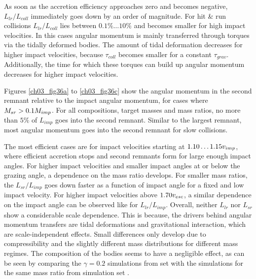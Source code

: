 As soon as the accretion efficiency approaches zero and becomes negative, $L_{lr} / L_{coll}$ immediately goes down by an order of magnitude. For hit \& run collisions $L_{lr} / L_{coll}$ lies between $0.1\% \dots 10\%$ and becomes smaller for high impact velocities. In this cases angular momentum is mainly transferred through torques via the tidally deformed bodies. The amount of tidal deformation decreases for higher impact velocities, because $\tau_{coll}$ becomes smaller for a constant $\tau_{grav}$. Additionally, the time for which these torques can build up angular momentum decreases for higher impact velocities.

Figures \ref{ch03_fig36a} to \ref{ch03_fig36c} show the angular momentum in the second remnant relative to the impact angular momentum, for cases where $M_{sr} > 0.1 M_{imp}$. For all compositions, target masses and mass ratios, no more than $5\%$ of $L_{imp}$ goes into the second remnant. Similar to the largest remnant, most angular momentum goes into the second remnant for slow collisions. 

The most efficient cases are for impact velocities starting at $1.10 \dots 1.15 v_{imp}$, where efficient accretion stops and second remnants form for large enough impact angles. For higher impact velocities and smaller impact angles at or below the grazing angle, a dependence on the mass ratio develops. For smaller mass ratios, the $L_{sr} / L_{imp}$ goes down faster as a function of impact angle for a fixed and low impact velocity. For higher impact velocities above $1.70 v_{esc}$, a similar dependence on the impact angle can be observed like for $L_{lr} / L_{imp}$.  Overall, neither $L_{lr}$ nor $L_{sr}$ show a considerable scale dependence. This is because, the drivers behind angular momentum transfers are tidal deformations and gravitational interaction, which are scale-independent effects. Small differences only develop due to compressibility and the slightly different mass distributions for different mass regimes. The composition of the bodies seems to have a negligible effect, as can be seen by comparing the $\gamma = 0.2$ simulations from set \css with the simulations for the same mass ratio from simulation set \iss.

